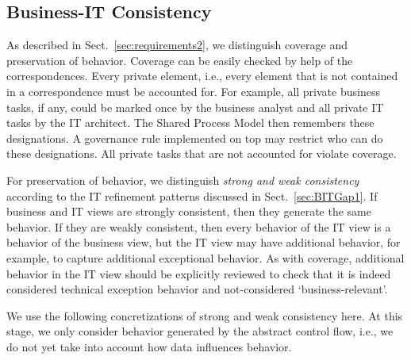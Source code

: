\subsection{Business-IT Consistency}

As described in Sect.~\ref{sec:requirements2}, we distinguish coverage and preservation of behavior. Coverage can be easily checked by help of the correspondences. Every private element, i.e., every element that is not contained in a correspondence must be accounted for. For example, all private business tasks, if any, could be marked once by the business analyst and all private IT tasks by the IT architect. The Shared Process Model then remembers these designations. A governance rule implemented on top may restrict who can do these designations. All private tasks that are not accounted for violate coverage.

For preservation of behavior, we distinguish \emph{strong and weak consistency} according to the IT refinement patterns discussed in Sect.~\ref{sec:BITGap1}. If business and IT views are strongly consistent, then they generate the same behavior. If they are weakly consistent, then every behavior of the IT view is a behavior of the business view, but the IT view may have additional behavior, for example, to capture additional exceptional behavior. As with coverage, additional behavior in the IT view should be explicitly reviewed to check that it is indeed considered technical exception behavior and not-considered `business-relevant'. 

We use the following concretizations of strong and weak consistency here. At this stage, we only consider behavior generated by the abstract control flow, i.e., we do not yet take into account how data influences behavior.



